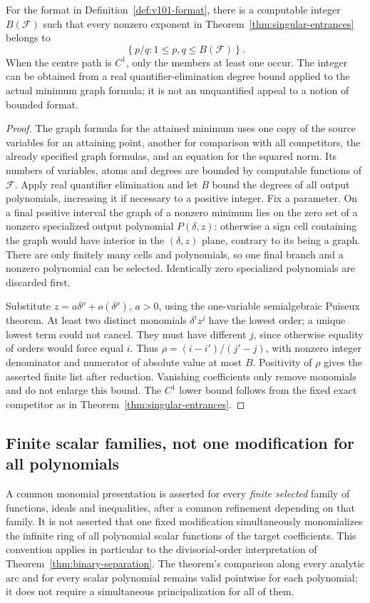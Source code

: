 \begin{proposition}\label{prop:v101-format}
For the format in Definition~\ref{def:v101-format}, there is a
computable integer $B(\mathcal F)$ such that every nonzero exponent
in Theorem~\ref{thm:singular-entrances} belongs to
\[
 \left\{p/q:1\le p,q\le B(\mathcal F)\right\}.
\]
When the centre path is $C^1$, only the members at least one occur.
The integer can be obtained from a real quantifier-elimination degree
bound applied to the actual minimum graph formula; it is not an
unquantified appeal to a notion of bounded format.
\end{proposition}
\begin{proof}
The graph formula for the attained minimum uses one copy of the
source variables for an attaining point, another for comparison with
all competitors, the already specified graph formulas, and an equation
for the squared norm. Its numbers of variables, atoms and degrees are
bounded by computable functions of $\mathcal F$. Apply real quantifier
elimination \cite{BPR06} and let $B$ bound the degrees of all output
polynomials, increasing it if necessary to a positive integer.
Fix a parameter. On a final positive interval the graph of a nonzero
minimum lies on the zero set of a nonzero specialized output polynomial
$P(\delta,z)$: otherwise a sign cell containing the graph would have
interior in the $(\delta,z)$ plane, contrary to its being a graph.
There are only finitely many cells and polynomials, so one final branch
and a nonzero polynomial can be selected. Identically zero specialized
polynomials are discarded first.

Substitute $z=a\delta^\rho+o(\delta^\rho)$, $a>0$, using the
one-variable semialgebraic Puiseux theorem. At least two distinct
monomials $\delta^i z^j$ have the lowest order; a unique lowest term
could not cancel. They must have different $j$, since otherwise equality
of orders would force equal $i$. Thus
$\rho=(i-i')/(j'-j)$, with nonzero integer denominator and numerator
of absolute value at most $B$. Positivity of $\rho$ gives the asserted
finite list after reduction. Vanishing coefficients only remove
monomials and do not enlarge this bound. The $C^1$ lower bound follows
from the fixed exact competitor as in
Theorem~\ref{thm:singular-entrances}.
\end{proof}

\subsection{Finite scalar families, not one modification for all polynomials}
A common monomial presentation is asserted for every \emph{finite
selected} family of functions, ideals and inequalities, after a common
refinement depending on that family. It is not asserted that one fixed
modification simultaneously monomializes the infinite ring of all
polynomial scalar functions of the target coefficients. This convention
applies in particular to the divisorial-order interpretation of
Theorem~\ref{thm:binary-separation}. The theorem's comparison along
every analytic arc and for every scalar polynomial remains valid
pointwise for each polynomial; it does not require a simultaneous
principalization for all of them.

